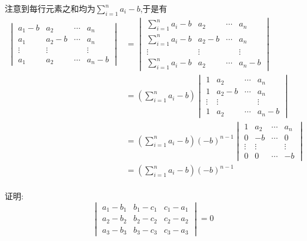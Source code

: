 \documentclass{ctexart}
\begin{document}
\begin{solution}
    注意到每行元素之和均为$\displaystyle\sum_{i=1}^{n}a_i-b$,于是有
    \[\begin{aligned}
        \begin{vmatrix}
            a_1-b&a_2&\cdots&a_n\\
            a_1&a_2-b&\cdots&a_n\\
            \vdots&\vdots& &\vdots\\
            a_1&a_2&\cdots&a_n-b
        \end{vmatrix}
        &= \begin{vmatrix}
                \sum_{i=1}^{n}a_i-b&a_2&\cdots&a_n\\
                \sum_{i=1}^{n}a_i-b&a_2-b&\cdots&a_n\\
                \vdots&\vdots& &\vdots\\
                \sum_{i=1}^{n}a_i-b&a_2&\cdots&a_n-b
            \end{vmatrix} \\
        &= \left(\sum_{i=1}^{n}a_i-b\right)\begin{vmatrix}
                1&a_2&\cdots&a_n\\
                1&a_2-b&\cdots&a_n\\
                \vdots&\vdots& &\vdots\\
                1&a_2&\cdots&a_n-b
            \end{vmatrix} \\
        &= \left(\sum_{i=1}^{n}a_i-b\right)(-b)^{n-1}\begin{vmatrix}
                1&a_2&\cdots&a_n\\
                0&-b&\cdots&0\\
                \vdots&\vdots& &\vdots\\
                0&0&\cdots&-b
            \end{vmatrix}\\
        &= \left(\sum_{i=1}^{n}a_i-b\right)(-b)^{n-1}\\
    \end{aligned}\]
\end{solution}
\begin{homework}[3(1)]
    证明:
    \[\begin{vmatrix}
        a_1-b_1&b_1-c_1&c_1-a_1\\
        a_2-b_2&b_2-c_2&c_2-a_2\\
        a_3-b_3&b_3-c_3&c_3-a_3
    \end{vmatrix}=0\]
\end{homework}
\end{document}
